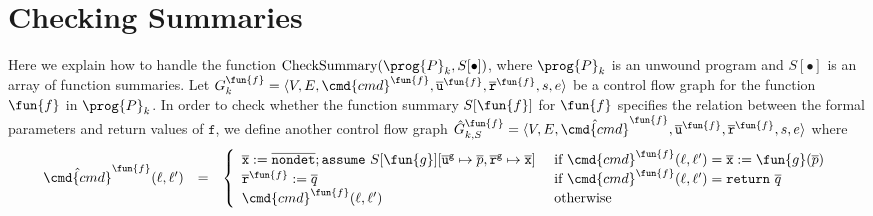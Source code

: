 
\section{Checking Summaries}\label{sec:checking-summary}

Here we explain how to handle the function $\textmd{CheckSummary} (\prog{P}_k, S[\bullet])$, where $\prog{P}_k$ is an unwound program and $S[\bullet]$ is an
array of function summaries.
Let $G^\fun{f}_k = \langle V, E, \cmd{cmd}^\fun{f}, \overline{\mathtt{u}}^\fun{f}, \overline{\mathtt{r}}^\fun{f},s,e \rangle$ be a
control flow graph for the function $\fun{f}$ in $\prog{P}_k$. In order to check whether the function
summary $S[{\fun{f}}]$ for $\fun{f}$ specifies the relation
between the formal parameters and return values of $\mathtt{f}$, 
we define another control flow graph
$\hat{G}^\fun{f}_{k,S} = \langle V, E, \hat{\cmd{cmd}}^\fun{f}, \overline{\mathtt{u}}^\fun{f}, \overline{\mathtt{r}}^\fun{f},s,e \rangle$ where
\begin{equation*}
  \begin{array}{rcl}
    \hat{\cmd{cmd}}^\fun{f} (\ell, \ell') & = &
    \left\{
      \begin{array}{ll}
        \overline{\mathtt{x}} := 
        \overline{\mathtt{nondet}};
        \mathtt{assume\ }S[{\fun{g}}][
        \mathtt{\overline{u}^g} \mapsto \overline{p},
        \mathtt{\overline{r}^g} \mapsto \overline{\mathtt{x}}]    
        &
        \text{ if } \cmd{cmd}^\fun{f} (\ell, \ell') =
        \overline{\mathtt{x}} := \fun{g} (\overline{p})\\
		\mathtt{\overline{r}}^\fun{f} := \overline{q}
        &
        \text{ if } \cmd{cmd}^\fun{f} (\ell, \ell') = \mathtt{return\ }
        \overline{q}\\
        \cmd{cmd}^\fun{f} (\ell, \ell')
        &
		\text{ otherwise}
      \end{array}
    \right.
  \end{array}
\end{equation*}

